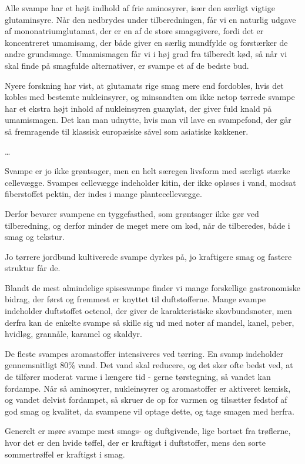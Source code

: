 \documentclass[
]{book}
\begin{document}
Alle svampe har et højt indhold af frie aminosyrer, især den særligt vigtige
glutaminsyre. Når den nedbrydes under tilberedningen, får vi en naturlig
udgave af mononatriumglutamat, der er en af de store smagsgivere, fordi det er
koncentreret umamisamg, der både giver en særlig mundfylde og forstærker de
andre grundsmage. Umamismagen får vi i høj grad fra tilberedt kød, så når vi
skal finde på smagfulde alternativer, er svampe et af de bedste bud.

Nyere forskning har vist, at glutamats rige smag mere end fordobles, hvis det
kobles med bestemte nukleinsyrer, og minsandten om ikke netop tørrede svampe
har et ekstra højt inhold af nukleinsyren guanylat, der giver fuld knald på
umamismagen. Det kan man udnytte, hvis man vil lave en svampefond, der går så
fremragende til klassisk europæiske såvel som asiatiske køkkener.

\ldots{}

Svampe er jo ikke grøntsager, men en helt særegen livsform med særligt stærke
cellevægge. Svampes cellevægge indeholder kitin, der ikke opløses i vand, modsat
fiberstoffet pektin, der indes i mange plantecellevægge.

Derfor bevarer svampene en tyggefasthed, som grøntsager ikke gør ved tilberedning,
og derfor minder de meget mere om kød, når de tilberedes, både i smag og tekstur.

Jo tørrere jordbund kultiverede svampe dyrkes på, jo kraftigere smag og fastere
struktur får de.

Blandt de mest almindelige spisesvampe finder vi mange forskellige gastronomiske
bidrag, der først og fremmest er knyttet til duftstofferne. Mange svampe indeholder
duftstoffet octenol, der giver de karakteristiske skovbundsnoter, men derfra
kan de enkelte svampe så skille sig ud med noter af mandel, kanel, peber,
hvidløg, grannåle, karamel og skaldyr.

De fleste svampes aromastoffer intensiveres ved tørring. En svamp indeholder
gennemsnitligt 80\% vand. Det vand skal reducere, og det sker ofte bedst ved, at de
tilfører moderat varme i længere tid - gerne tørstegning, så vandet kan
fordampe. Når så aminosyrer, nukleinsyrer og aromastoffer er aktiveret kemisk,
og vandet delvist fordampet, så skruer de op for varmen og tilsætter fedstof
af god smag og kvalitet, da svampene vil optage dette, og tage smagen med herfra.

Generelt er møre svampe mest smags- og duftgivende, lige bortset fra trøflerne,
hvor det er den hvide tøffel, der er kraftigst i duftstoffer, mens den sorte
sommertrøffel er kraftigst i smag.
\end{document}
